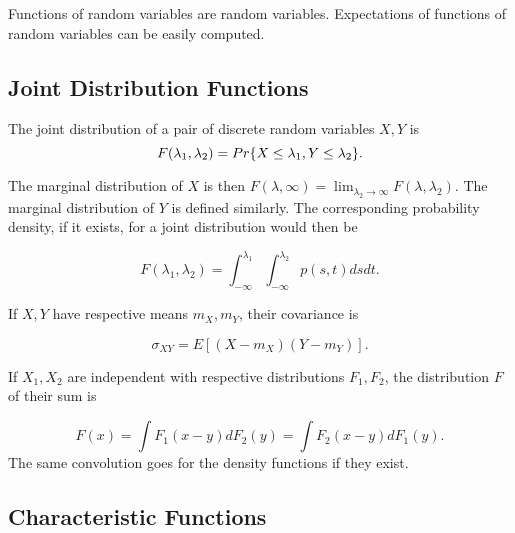 \par Functions of random variables are random variables. Expectations of functions of random variables can be easily
computed.

\subsection{Joint Distribution Functions}
The joint distribution of a pair of discrete random variables $X, Y$ is
\begin{equation}
    F(\lambda_1, \lambda_2) = Pr\{X\leq\lambda_1, Y\leq\lambda_2\}.
\end{equation}

The marginal distribution of $X$ is then $F(\lambda, \infty) = \lim_{\lambda_2\to\infty}F(\lambda, \lambda_2)$.
The marginal distribution of $Y$ is defined similarly.
The corresponding probability density, if it exists, for a joint distribution would then be

\begin{equation}
    F(\lambda_1, \lambda_2) = \int_{-\infty}^{\lambda_1}\int_{-\infty}^{\lambda_2}p(s,t)dsdt.
\end{equation}

\par If $X, Y$ have respective means $m_X, m_Y$, their covariance is

\begin{equation}
\sigma_{XY} = E[(X-m_X)(Y-m_Y)].
\end{equation}

\par If $X_1, X_2$ are independent with respective distributions $F_1, F_2$, the distribution $F$ of their sum
is

\begin{equation}
F(x) = \int F_1(x-y)dF_2(y) = \int F_2(x-y)dF_1(y).
\end{equation}
The same convolution goes for the density functions if they exist.

\subsection{Characteristic Functions}


